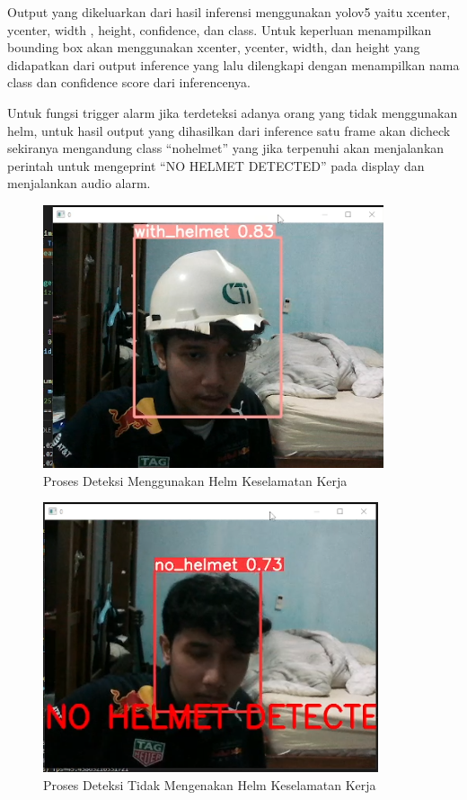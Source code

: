 Output yang dikeluarkan dari hasil inferensi menggunakan yolov5 yaitu xcenter, ycenter, width , height, confidence, dan class. Untuk keperluan menampilkan bounding box akan menggunakan xcenter, ycenter, width, dan height yang didapatkan dari output inference yang lalu dilengkapi dengan menampilkan nama class dan confidence score dari inferencenya. 

Untuk fungsi trigger alarm jika terdeteksi adanya orang yang tidak menggunakan helm, untuk hasil output yang dihasilkan dari inference satu frame akan dicheck sekiranya mengandung class “no\textunderscore helmet” yang jika terpenuhi akan  menjalankan perintah untuk mengeprint “NO HELMET DETECTED” pada display dan menjalankan audio alarm. 

\begin{figure}[ht]
  \centering
  \includegraphics[scale=1]{gambar/Screenshot_90.png}
  \caption{Proses Deteksi Menggunakan Helm Keselamatan Kerja}
  \label{fig:deteksiwthhelm}  
\end{figure}

\begin{figure}[ht]
  \centering
  \includegraphics[scale=1]{gambar/Screenshot_91.png}
  \caption{Proses Deteksi Tidak Mengenakan Helm Keselamatan Kerja}
  \label{fig:deteksinohelm}  
\end{figure}

